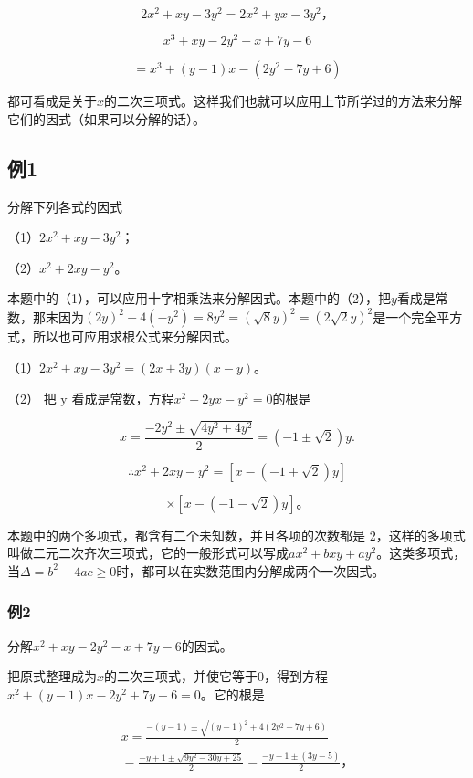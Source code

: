 \[
2 x ^ {2} + x y - 3 y ^ {2} = 2 x ^ {2} + y x - 3 y ^ {2}\text{，}
\]

\[
x ^ {3} + x y - 2 y ^ {2} - x + 7 y - 6
\]

\[
= x ^ {3} + (y - 1) x - (2 y ^ {2} - 7 y + 6)
\]

都可看成是关于\(x\)的二次三项式。这样我们也就可以应用上节所学过的方法来分解它们的因式（如果可以分解的话）。

\subsection{例1}

分解下列各式的因式

（1）\(2x^{2} + xy - 3y^{2}\)；

（2）\(x^{2} + 2xy - y^{2}\)。

本题中的（1），可以应用十字相乘法来分解因式。本题中的（2），把\(y\)看成是常数，那末因为\((2y)^{2} - 4(-y^{2}) = 8y^{2} = (\sqrt{8}y)^{2} = (2\sqrt{2}y)^{2}\)是一个完全平方式，所以也可应用求根公式来分解因式。

 （1）\(2x^{2} + xy - 3y^{2} = (2x + 3y)(x - y)\)。

（2） 把 y 看成是常数，方程\(x^{2} + 2yx - y^{2} = 0\)的根是

\[
x = \frac{- 2 y ^ {2} \pm \sqrt {4 y ^ {2} + 4 y ^ {2}}}{2} = (- 1 \pm \sqrt {2}) y.
\]

\[
\therefore x ^ {2} + 2 x y - y ^ {2} = [ x - (- 1 + \sqrt {2}) y ]
\]

\[
\times [ x - (- 1 - \sqrt {2}) y ]\text{。}
\]

本题中的两个多项式，都含有二个未知数，并且各项的次数都是
2，这样的多项式叫做二元二次齐次三项式，它的一般形式可以写成\(ax^2 + bxy + ay^2\)。这类多项式，当\(\Delta = b^2 - 4ac \geqslant 0\)时，都可以在实数范围内分解成两个一次因式。

\subsubsection{例2}

分解\(x^{2} + xy - 2y^{2} - x + 7y - 6\)的因式。

把原式整理成为\(x\)的二次三项式，并使它等于0，得到方程\(x^{2} + (y - 1)x - 2y^{2} + 7y - 6 = 0\)。它的根是

\[
\begin{array}{l} x = \frac{- (y - 1) \pm \sqrt {(y - 1) ^ {2} + 4 (2 y ^ {2} - 7 y + 6)}}{2} \\ = \frac{- y + 1 \pm \sqrt {9 y ^ {2} - 30 y + 25}}{2} = \frac{- y + 1 \pm (3 y - 5)}{2}\text{，} \\ \end{array}
\]


